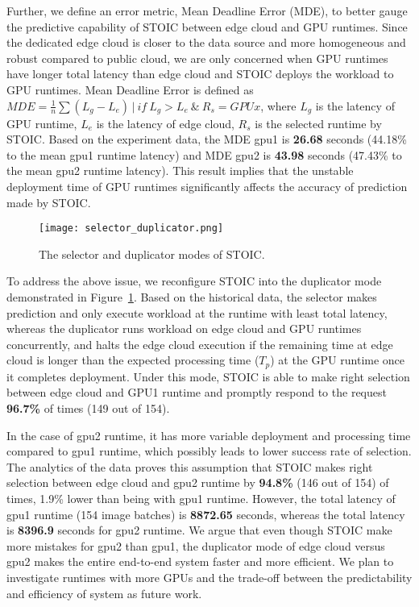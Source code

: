 Further, we define an error metric, Mean Deadline Error (MDE), to better gauge the predictive capability of STOIC between edge cloud and GPU runtimes. Since the dedicated edge cloud is closer to the data source and more homogeneous and robust compared to public cloud, we are only concerned when GPU runtimes have longer total latency than edge cloud and STOIC deploys the workload to GPU runtimes. Mean Deadline Error is defined as $MDE = \frac{1}{n}\sum(L_g - L_e) \,|\ if \ L_g > L_e \ \& \ R_s = GPUx $, where $L_g$ is the latency of GPU runtime, $L_e$ is the latency of edge cloud, $R_s$ is the selected runtime by STOIC. Based on the experiment data, the MDE gpu1 is \textbf{26.68} seconds (44.18\% to the mean gpu1 runtime latency) and MDE gpu2 is \textbf{43.98} seconds (47.43\% to the mean gpu2 runtime latency). This result implies that the unstable deployment time of GPU runtimes significantly affects the accuracy of prediction made by STOIC. 

\begin{figure}[t] \centering 
\texttt{[image: selector\_duplicator.png]}
\caption{The selector and duplicator modes of STOIC. 
\label{fig:duplicator}}
\end{figure}

To address the above issue, we reconfigure STOIC into the duplicator mode demonstrated in Figure~\ref{fig:duplicator}. Based on the historical data, the selector makes prediction and only execute workload at the runtime with least total latency, whereas the duplicator runs workload on edge cloud and GPU runtimes concurrently, and halts the edge cloud execution if the remaining time at edge cloud is longer than the expected processing time ($T_p$) at the GPU runtime once it completes deployment. Under this mode, STOIC is able to make right selection between edge cloud and GPU1 runtime and promptly respond to the request \textbf{96.7\%} of times (149 out of 154). 

In the case of gpu2 runtime, it has more variable deployment and processing time compared to gpu1 runtime, which possibly leads to lower success rate of selection. The analytics of the data proves this assumption that STOIC makes right selection between edge cloud and gpu2 runtime by \textbf{94.8\%} (146 out of 154) of times, 1.9\% lower than being with gpu1 runtime. However, the total latency of gpu1 runtime (154 image batches) is \textbf{8872.65} seconds, whereas the total latency is \textbf{8396.9} seconds for gpu2 runtime. We argue that even though STOIC make more mistakes for gpu2 than gpu1, the duplicator mode of edge cloud versus gpu2 makes the entire end-to-end system faster and more efficient. We plan to investigate runtimes with more GPUs and the trade-off between the predictability and efficiency of system as future work.
